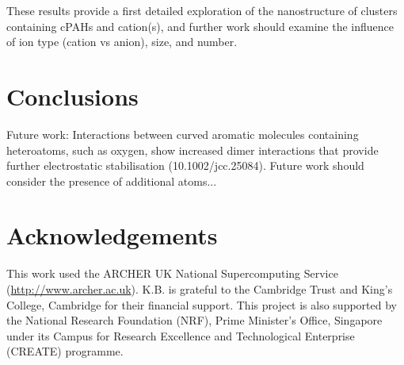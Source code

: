 These results provide a first detailed exploration of the nanostructure of clusters containing cPAHs and cation(s), and further work should examine the influence of ion type (cation vs anion), size, and number.


\section{Conclusions}

Future work:
Interactions between curved aromatic molecules containing heteroatoms, such as oxygen, show increased dimer interactions that provide further electrostatic stabilisation (10.1002/jcc.25084).  Future work should consider the presence of additional atoms...




\section*{Acknowledgements}
This work used the ARCHER UK National Supercomputing Service (\url{http://www.archer.ac.uk}).
K.B. is grateful to the Cambridge Trust and King's College, Cambridge for their financial support.
This project is also supported by the National Research Foundation (NRF), Prime Minister's Office, Singapore under its Campus for Research Excellence and Technological Enterprise (CREATE) programme.
